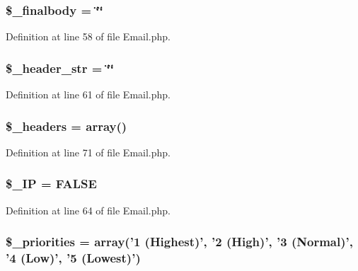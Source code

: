 \subsubsection[{\$\-\_\-finalbody}]{\setlength{\rightskip}{0pt plus 5cm}\$\-\_\-finalbody = \char`\"{}\char`\"{}}\label{class_c_i___email_afe3b263ee6d58805f3c06ef1fdc863a5}


Definition at line 58 of file Email.\-php.

\subsubsection[{\$\-\_\-header\-\_\-str}]{\setlength{\rightskip}{0pt plus 5cm}\$\-\_\-header\-\_\-str = \char`\"{}\char`\"{}}\label{class_c_i___email_a551b64b005666b98b001ed7ff405047c}


Definition at line 61 of file Email.\-php.

\subsubsection[{\$\-\_\-headers}]{\setlength{\rightskip}{0pt plus 5cm}\$\-\_\-headers = array()}\label{class_c_i___email_a1481ae63a7fb295087c3a668a0359500}


Definition at line 71 of file Email.\-php.

\subsubsection[{\$\-\_\-\-I\-P}]{\setlength{\rightskip}{0pt plus 5cm}\$\-\_\-\-I\-P = F\-A\-L\-S\-E}\label{class_c_i___email_ab476361e2d82b932d0ab83d516741b37}


Definition at line 64 of file Email.\-php.

\subsubsection[{\$\-\_\-priorities}]{\setlength{\rightskip}{0pt plus 5cm}\$\-\_\-priorities = array('1 (Highest)', '2 (High)', '3 (Normal)', '4 (Low)', '5 (Lowest)')}\label{class_c_i___email_af2e56ba04b214aad41be6db88e729645}


